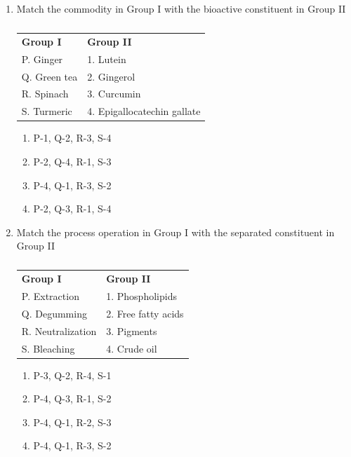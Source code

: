 \documentclass[a4paper,10pt]{article}
\begin{document}
\begin{enumerate}
    \item Match the commodity in Group I with the bioactive constituent in Group II
    \begin{table}[h!] \centering \caption*{} \label{tab:q10_food_2018}
        \begin{tabular}{ll}
            \textbf{Group I} & \textbf{Group II} \\
            P. Ginger & 1. Lutein \\
            Q. Green tea & 2. Gingerol \\
            R. Spinach & 3. Curcumin \\
            S. Turmeric & 4. Epigallocatechin gallate
        \end{tabular}
    \end{table}
    \hfill{}
    \begin{enumerate}[label=\Alph*)]
        \item P-1, Q-2, R-3, S-4
        \item P-2, Q-4, R-1, S-3
        \item P-4, Q-1, R-3, S-2
        \item P-2, Q-3, R-1, S-4
    \end{enumerate}

    \item Match the process operation in Group I with the separated constituent in Group II
    \begin{table}[h!] \centering \caption*{} \label{tab:q11_food_2018}
        \begin{tabular}{ll}
            \textbf{Group I} & \textbf{Group II} \\
            P. Extraction & 1. Phospholipids \\
            Q. Degumming & 2. Free fatty acids \\
            R. Neutralization & 3. Pigments \\
            S. Bleaching & 4. Crude oil
        \end{tabular}
    \end{table}
    \hfill{}
    \begin{enumerate}[label=\Alph*)]
        \item P-3, Q-2, R-4, S-1
        \item P-4, Q-3, R-1, S-2
        \item P-4, Q-1, R-2, S-3
        \item P-4, Q-1, R-3, S-2
    \end{enumerate}


\end{enumerate}
\end{document}
